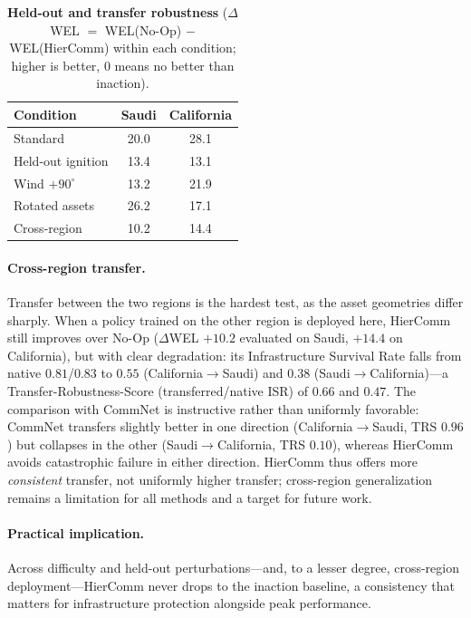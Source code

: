 \documentclass[letterpaper]{article}
\begin{document}
\begin{table}[t]
\centering
\caption{\textbf{Held-out and transfer robustness} ($\Delta$WEL $=$ WEL(No-Op) $-$ WEL(HierComm) within each condition; higher is better, $0$ means no better than inaction).}
\label{tab:failure}
\vspace{0.5em}
\begin{tabular}{lcc}
\toprule
Condition & Saudi & California \\
\midrule
Standard & 20.0 & 28.1 \\
Held-out ignition & 13.4 & 13.1 \\
Wind $+90^\circ$ & 13.2 & 21.9 \\
Rotated assets & 26.2 & 17.1 \\
Cross-region & 10.2 & 14.4 \\
\bottomrule
\end{tabular}
\end{table}

\paragraph{Cross-region transfer.}
Transfer between the two regions is the hardest test, as the asset geometries differ sharply. When a policy trained on the other region is deployed here, HierComm still improves over No-Op ($\Delta$WEL $+10.2$ evaluated on Saudi, $+14.4$ on California), but with clear degradation: its Infrastructure Survival Rate falls from native $0.81$/$0.83$ to $0.55$ (California$\to$Saudi) and $0.38$ (Saudi$\to$California)---a Transfer-Robustness-Score (transferred/native ISR) of $0.66$ and $0.47$. The comparison with CommNet is instructive rather than uniformly favorable: CommNet transfers slightly better in one direction (California$\to$Saudi, TRS $0.96$) but collapses in the other (Saudi$\to$California, TRS $0.10$), whereas HierComm avoids catastrophic failure in either direction. HierComm thus offers more \emph{consistent} transfer, not uniformly higher transfer; cross-region generalization remains a limitation for all methods and a target for future work.

\paragraph{Practical implication.}
Across difficulty and held-out perturbations---and, to a lesser degree, cross-region deployment---HierComm never drops to the inaction baseline, a consistency that matters for infrastructure protection alongside peak performance.
\end{document}
